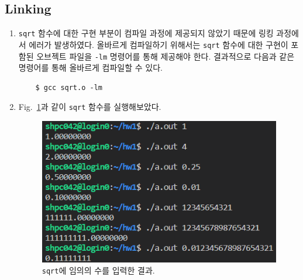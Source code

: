 \subsection{Linking}

\begin{enumerate}[label= (\alph*)]
    \item {
        \texttt{sqrt} 함수에 대한 구현 부분이 컴파일 과정에 제공되지 않았기 때문에 링킹 과정에서
        에러가 발생하였다.
        올바르게 컴파일하기 위해서는 \texttt{sqrt} 함수에 대한 구현이 포함된 오브젝트 파일을
        \texttt{-lm} 명령어를 통해 제공해야 한다. 결과적으로 다음과 같은 명령어를 통해
        올바르게 컴파일할 수 있다.

        \begin{verbatim}
    $ gcc sqrt.o -lm
        \end{verbatim}
    }

    \item {
        Fig.~\ref{fig:1-3}과 같이 \texttt{sqrt} 함수를 실행해보았다.

        \begin{figure}
            \centering
            \includegraphics[scale=1]{imgs/Figure05_sqrt_trial.png}
            \caption{\label{fig:1-3}
                \texttt{sqrt}에 임의의 수를 입력한 결과.
            }
        \end{figure}
    }
    
\end{enumerate}